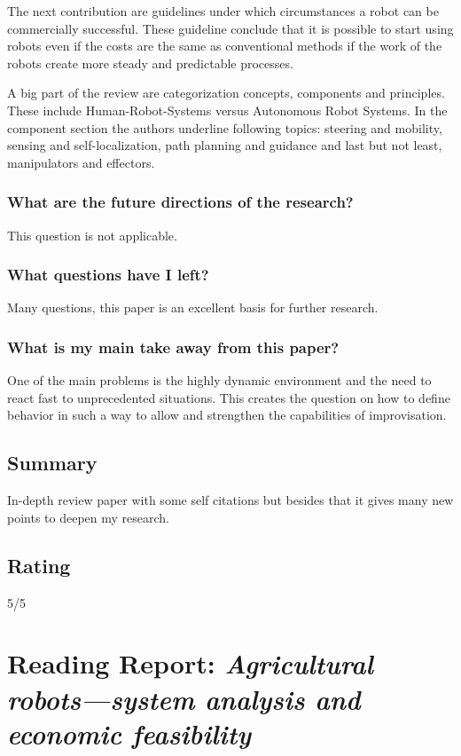 The next contribution are guidelines under which circumstances a robot can be commercially successful. These guideline conclude
that it is possible to start using robots even if the costs are the same as conventional methods if the work of
the robots create more steady and predictable processes.

A big part of the review are categorization concepts, components and principles. These include Human-Robot-Systems versus
Autonomous Robot Systems. In the component section the authors underline following topics: steering and mobility, 
sensing and self-localization, path planning and guidance and last but not least, manipulators and effectors.
\subsubsection*{What are the future directions of the research?}
This question is not applicable.
\subsubsection*{What questions have I left?}
Many questions, this paper is an excellent basis for further research.
\subsubsection*{What is my main take away from this paper?}
One of the main problems is the highly dynamic environment and the need to react fast to unprecedented situations.
This creates the question on how to define behavior in such a way to allow and strengthen the capabilities of 
improvisation.
\subsection*{Summary}
In-depth review paper with some self citations but besides that it gives many new points to deepen my research.

\subsection*{Rating}
5/5



\section{Reading Report: \emph{Agricultural robots—system analysis and economic feasibility}}
\cite{Pedersen2006}

